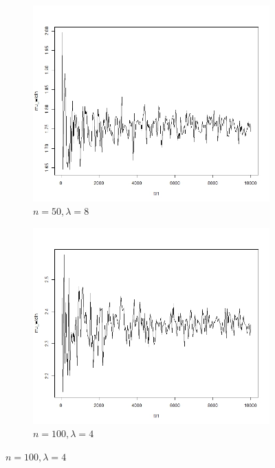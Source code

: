 \documentclass{article}
\begin{document}
\begin{figure}[!htb]
    	\begin{subfigure}[b]{0.5\textwidth}
    	\includegraphics[width = \textwidth]{./Codes/mu_50_8.jpg}
    	\caption{$n = 50, \lambda = 8$}
    	\end{subfigure}%
    	\begin{subfigure}[b]{0.5\textwidth}
    	\includegraphics[width = \textwidth]{./Codes/mu_100_4.jpg}
    	\caption{$n = 100, \lambda = 4$}
    	\end{subfigure}%


\end{figure}
\end{document}
